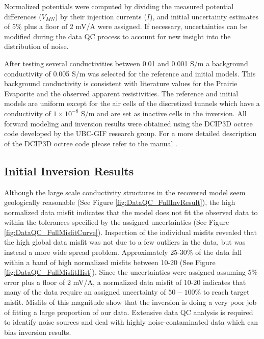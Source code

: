 \documentclass[final,authoryear,5p,times,twocolumn]{elsarticle}
\begin{document}
Normalized potentials were computed by dividing the measured potential differences ($V_{MN}$) by their injection currents ($I$), and initial uncertainty estimates of $5\%$ plus a floor of 2 mV/A were assigned. If necessary, uncertainties can be modified during the data QC process to account for new insight into the distribution of noise.

After testing several conductivities between 0.01 and 0.001 S/m a background conductivity of 0.005 S/m was selected for the reference and initial models. This background conductivity is consistent with literature values for the Prairie Evaporite \citep{Duckworth1992,Chouteau1997} and the observed apparent resistivities. The reference and initial models are uniform except for the air cells of the discretized tunnels which have a conductivity of $1 \times 10^{-8}$ S/m and are set as inactive cells in the inversion. All forward modeling and inversion results were obtained using the DCIP3D octree code developed by the UBC-GIF research group. For a more detailed description of the DCIP3D octree code please refer to the manual \citep{DCIP3D_Octree_Manual}.

\subsection{Initial Inversion Results}
\label{InitialInvResults}

Although the large scale conductivity structures in the recovered model seem geologically reasonable (See Figure \ref{fig:DataQC_FullInvResult}), the high normalized data misfit indicates that the model does not fit the observed data to within the tolerances specified by the assigned uncertainties (See Figure \ref{fig:DataQC_FullMisfitCurve}). Inspection of the individual misfits revealed that the high global data misfit was not due to a few outliers in the data, but was instead a more wide spread problem. Approximately 25-30$\%$ of the data fall within a band of high normalized misfits between 10-20 (See Figure \ref{fig:DataQC_FullMisfitHist}). Since the uncertainties were assigned assuming $5\%$ error plus a floor of 2 mV/A, a normalized data misfit of 10-20 indicates that many of the data require an assigned uncertainty of $50-100\%$ to reach target misfit. Misfits of this magnitude show that the inversion is doing a very poor job of fitting a large proportion of our data. Extensive data QC analysis is required to identify noise sources and deal with highly noise-contaminated data which can bias inversion results.
\end{document}
